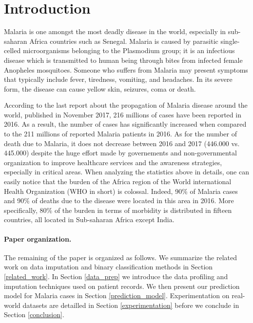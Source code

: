 \section{Introduction}\label{intro}

Malaria is one amongst the most deadly disease in the world, especially in sub-saharan Africa countries such as Senegal.
Malaria is caused by parasitic single-celled microorganisms belonging to the Plasmodium group; it is an infectious
disease which is transmitted to human being through bites from infected female Anopheles mosquitoes. Someone who suffers
from  Malaria may present symptoms that typically include fever, tiredness, vomiting, and headaches. In its severe form,
the disease can cause yellow skin, seizures, coma or death.

According to the last report about the propagation of Malaria disease around the world, published in November 2017, 216 millions of cases have been 
reported in 2016. As a result, the number of cases has significantly increased when compared to the 211 millions of reported Malaria patients in 2016.
As for the number of death due to Malaria, it does not decrease between 2016 and 2017 (446.000 vs. 445.000) despite the huge effort made by governements
and non-governmental organization to improve healthcare services and the awareness strategies, especially in critical areas. 
When analyzing the statistics above in details, one can easily notice that the burden of the Africa region of the World 
international Health Organization (WHO in short) is colossal. Indeed, 90\% of Malaria cases and 90\% of deaths due to the disease were located in this area in 2016.
More specifically, 80\% of the burden in terms of morbidity is distributed in fifteen countries, all located in Sub-saharan Africa except India.  













\paragraph*{Paper organization.}The remaining of the paper is organized as follows. We summarize the related work on data imputation and binary classification methods in Section \ref{related_work}.
In Section \ref{data_prep} we introduce the data profiling and imputation techniques used on patient records. We then present our prediction model for Malaria cases in Section \ref{prediction_model}.
Experimentation on real-world datasets are detailled in Section \ref{experimentation} before we conclude in Section \ref{conclusion}. 
